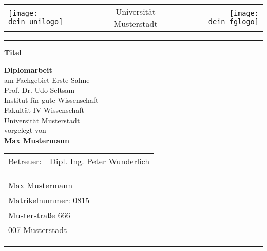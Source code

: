 
\newcommand{\trtitle}{Titel}
\newcommand{\trtype}{Diplomarbeit}
\newcommand{\trauthor}{Max Mustermann}
\newcommand{\trstrasse}{Musterstraße 666}
\newcommand{\trmatrikelnummer}{0815}
\newcommand{\trort}{007 Musterstadt}
\newcommand{\trbetreuer}{Dipl. Ing. Peter Wunderlich}
\newcommand{\trprof}{Prof. Dr. Udo Seltsam}
\newcommand{\trfachgebiet}{Erste Sahne}
\newcommand{\trinstitut}{gute Wissenschaft}
\newcommand{\trfakultaet}{IV Wissenschaft}
\newcommand{\truni}{Universität Musterstadt}
\newcommand{\trdate}{\today}

\thispagestyle{empty}

\begin{tabular}{lcr}
  \texttt{[image: dein\_unilogo]} & %
  \hspace{2cm} \truni \hspace{2cm} &
  \texttt{[image: dein\_fglogo]} %
  \\
\end{tabular}

\rule{\textwidth}{0.4pt}

\vspace{2.5cm}
\begin{center}
  \textbf{\LARGE \trtitle}
\end{center}
\vspace{2cm}

\begin{center}
  \textbf{\trtype} \\
  am Fachgebiet \trfachgebiet \\
  \trprof \\
  Institut für \trinstitut \\
  Fakultät \trfakultaet \\
  \truni \\[0.5cm]
  vorgelegt von \\
  \textbf{\trauthor}
\end{center}

\vspace{1cm}


\begin{center}
\begin{tabular}{ll}
Betreuer: & \trbetreuer \\
\end{tabular}
\end{center}

\vfill

\begin{tabular}{l}
\trauthor \\
Matrikelnummer:  \trmatrikelnummer \\
\trstrasse \\
\trort
\end{tabular}

\rule{\textwidth}{0.4pt}
